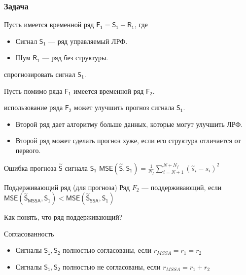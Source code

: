 \documentclass[ucs, notheorems, handout]{beamer}
\begin{document}
\begin{frame}
    \frametitle{Задача}

    Пусть имеется временной ряд $\mathsf{F_1 = S_1 + R_1}$, где
    \begin{itemize}
        \item Сигнал $\mathsf{S_1}$ --- ряд управляемый ЛРФ.
        \item Шум $\mathsf{R_1}$ --- ряд без структуры.
    \end{itemize} 

    спрогнозировать сигнал $\mathsf{S_1}$.

    Пусть помимо ряда $\mathsf{F_1}$ имеется временной ряд $\mathsf{F_2}$.

    использование ряда $\mathsf{F_2}$ может улучшить прогноз сигнала $\mathsf{S_1}$.

    \begin{itemize}
        \item Второй ряд дает алгоритму больше данных, которые могут улучшить ЛРФ.
        \item Второй ряд может сделать прогноз хуже, если его структура отличается от первого.
    \end{itemize}
\end{frame}

\begin{frame}
    \begin{block}{Ошибка прогноза $\overset{\sim}{\mathsf{S}}$ сигнала $\mathsf{S_1}$}
        $\mathsf{MSE(\overset{\sim}{S}, S_1)} = \frac{1}{N_{f}} \sum_{i = N + 1}^{N + N_{f}} (\overset{\sim}{s}_i - s_i)^2$
    \end{block}

    \begin{block}{Поддерживающий ряд (для прогноза)}
        Ряд $F_2$ --- поддерживающий, если $\mathsf{MSE(\overset{\sim}{S}_{MSSA}, S_1)} < \mathsf{MSE(\overset{\sim}{S}_{SSA}, S_1)}$
    \end{block}

     Как понять, что ряд поддерживающий? 

    \begin{block}{Согласованность}
        \begin{itemize}
            \item Сигналы $\mathsf{S_1, S_2}$ полностью согласованы, если $r_{MSSA} = r_1 = r_2$
            \item Сигналы $\mathsf{S_1, S_2}$ полностью не согласованы, если $r_{MSSA} = r_1 + r_2$
        \end{itemize}
    \end{block}
\end{frame}
\end{document}
